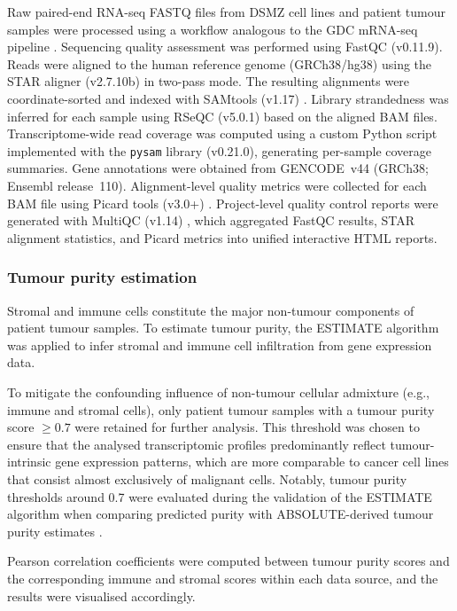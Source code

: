 Raw paired-end RNA-seq FASTQ files from DSMZ cell lines and patient tumour samples were processed using a workflow analogous to the GDC mRNA-seq pipeline \citep{GDCpipeline}.  Sequencing quality assessment was performed using FastQC (v0.11.9). Reads were aligned to the human reference genome (GRCh38/hg38) using the STAR aligner (v2.7.10b) \citep{Dobin2013} in two-pass mode. The resulting alignments were coordinate-sorted and indexed with SAMtools (v1.17) \citep{Danecek2021}. Library strandedness was inferred for each sample using RSeQC (v5.0.1) \citep{Wang2012} based on the aligned BAM files. Transcriptome-wide read coverage was computed using a custom Python script implemented with the \texttt{pysam} library (v0.21.0), generating per-sample coverage summaries. Gene annotations were obtained from GENCODE~v44 (GRCh38; Ensembl release~110). Alignment-level quality metrics were collected for each BAM file using Picard tools (v3.0+) \citep{Picard2019}. Project-level quality control reports were generated with MultiQC (v1.14) \citep{Ewels2016}, which aggregated FastQC results, STAR alignment statistics, and Picard metrics into unified interactive HTML reports.

\subsubsection{Tumour purity estimation}

Stromal and immune cells constitute the major non-tumour components of patient tumour samples. To estimate tumour purity, the ESTIMATE algorithm \cite{Yoshihara2013} was applied to infer stromal and immune cell infiltration from gene expression data.

To mitigate the confounding influence of non-tumour cellular admixture (e.g., immune and stromal cells), only patient tumour samples with a tumour purity score $\geq 0.7$ were retained for further analysis. This threshold was chosen to ensure that the analysed transcriptomic profiles predominantly reflect tumour-intrinsic gene expression patterns, which are more comparable to cancer cell lines that consist almost exclusively of malignant cells. Notably, tumour purity thresholds around 0.7 were evaluated during the validation of the ESTIMATE algorithm when comparing predicted purity with ABSOLUTE-derived tumour purity estimates \cite{Yoshihara2013}.

Pearson correlation coefficients were computed between tumour purity scores and the corresponding immune and stromal scores within each data source, and the results were visualised accordingly.
